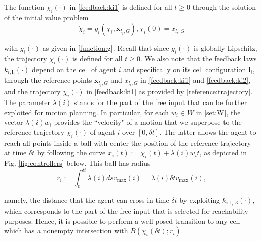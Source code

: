 \documentclass[reqno]{amsart}
\theoremstyle{plain}
\theoremstyle{definition}
\numberwithin{equation}{section}
\begin{document}
\noindent The function  $\chi_i(\cdot)$ in \eqref{feedback:ki1} is defined for all $t\ge 0$ through the solution of the initial value problem 
\begin{equation} \label{reference:trajectory}
\dot{\chi}_i=g_i(\chi_i,{\textbf{{x}}}_{l_j,G}), \chi_i(0)=x_{l_i,G} 
\end{equation}

\noindent with $g_i(\cdot)$ as given in \eqref{function:g}. Recall that since $g_i(\cdot)$ is globally Lipschitz, the trajectory $\chi_i(\cdot)$ is defined for all $t\ge 0$. We also note that the feedback laws $k_{i,{\textbf{{l}}}_i}(\cdot)$ depend on the cell of agent $i$ and specifically on its cell configuration ${\textbf{{l}}}_i$, through the reference points ${\textbf{{x}}}_{l_j,G}$ and  $x_{l_i,G}$ in \eqref{feedback:ki1} and \eqref{feedback:ki2}, and the trajectory $\chi_i(\cdot)$ in \eqref{feedback:ki1} as provided by \eqref{reference:trajectory}. The parameter $\lambda(i)$ stands for the part of the free input that can be further exploited for motion planning. In particular, for each $w_i\in W$ in \eqref{set:W}, the vector $\lambda(i) w_i$ provides the ``velocity" of a motion that we superpose to the reference trajectory $\chi_i(\cdot)$ of agent $i$ over $[0,\delta t]$. The latter allows the agent to reach all points inside a ball with center the position of the reference trajectory at time $\delta t$ by following the curve $\bar{x}_i(t):=\chi_i(t)+\lambda(i)w_it$, as depicted in Fig. \ref{fig:controllers} below. This ball has radius
\begin{equation} \label{distance:r}
r_i:=\int_0^{\delta t}\lambda(i)dsv_{\max}(i)=\lambda(i)\delta tv_{\max}(i),
\end{equation}

\noindent namely, the distance that the agent can cross in  time $\delta t$ by exploiting $k_{i,{\textbf{{l}}}_i,3}(\cdot)$, which corresponds to the part of the free input that is selected  for reachability purposes. Hence, it is possible to perform a well posed transition to any cell which has a nonempty intersection with $B(\chi_i(\delta t);r_i)$. 
\end{document}
